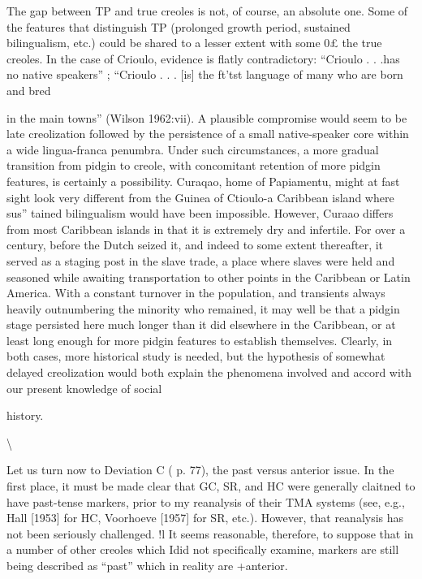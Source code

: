 The gap between TP and true creoles is not, of course, an abso\-lute one. Some of the features that distinguish TP (prolonged growth period, sustained bilingualism, etc.) could be shared to a lesser extent with some 0£ the true creoles. In the case of Crioulo, evidence is flatly contradictory: ``Crioulo . . .has no native speakers'' \citep{Alleyne1979}; ``Crioulo . . . [is] the ft'tst language of many who are born and bred

in the main towns'' (Wilson 1962:vii). A plausible compromise would seem to be late creolization followed by the persistence of a small native-speaker core within a wide lingua-franca penumbra. Under such circumstances, a more gradual transition from pidgin to creole, with concomitant retention of more pidgin features, is certainly a possibility. Curaqao, home of Papiamentu, might at fast sight look very different from the Guinea of Ctioulo-a Caribbean island where sus'' tained bilingualism would have been impossible. However, Curaao differs from most Caribbean islands in that it is extremely dry and infertile. For over a century, before the Dutch seized it, and indeed to some extent thereafter, it served as a staging post in the slave trade, a place where slaves were held and seasoned while awaiting trans\-portation to other points in the Caribbean or Latin America. With a constant turnover in the population, and transients always heavily outnumbering the minority who remained, it may well be that a pidgin stage persisted here much longer than it did elsewhere in the Caribbean, or at least long enough for more pidgin features to establish themselves. Clearly, in both cases, more historical study is needed, but the hypothe\-sis of somewhat delayed creolization would both explain the phe\-nomena involved and accord with our present knowledge of social

history.

{\textbackslash}


Let us turn now to Deviation C ( p. 77), the past versus anterior issue. In the first place, it must be made clear that GC, SR, and HC were generally claitned to have past-tense markers, prior to my re\-analysis of their TMA systems (see, e.g., Hall [1953] for HC, Voorhoeve [1957] for SR, etc.). However, that reanalysis has not been seriously challenged. !l It seems reasonable, therefore, to suppose that in a number of other creoles which Idid not specifically examine, markers are still being described as ``past'' which in reality are +anterior.

